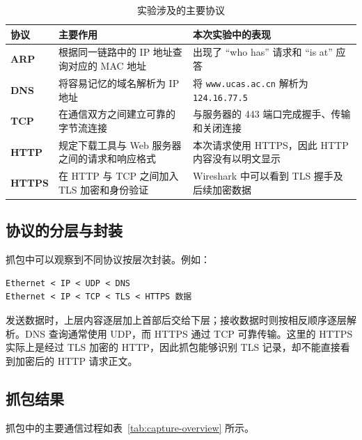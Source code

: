 \documentclass[UTF8,12pt,a4paper,fontset=fandol]{ctexart}
\begin{document}
\begin{table}[H]
  \centering
  \small
  \caption{实验涉及的主要协议}
  \begin{tabularx}{\textwidth}{>{\bfseries\centering\arraybackslash}p{1.5cm}L{5.0cm}Y}
    \toprule
     协议 & 主要作用 & 本次实验中的表现 \\
    \midrule
    ARP & 根据同一链路中的 IP 地址查询对应的 MAC 地址 & 出现了 ``who has'' 请求和 ``is at'' 应答 \\
    DNS & 将容易记忆的域名解析为 IP 地址 & 将 \texttt{www.ucas.ac.cn} 解析为 \texttt{124.16.77.5} \\
    TCP & 在通信双方之间建立可靠的字节流连接 & 与服务器的 443 端口完成握手、传输和关闭连接 \\
    HTTP & 规定下载工具与 Web 服务器之间的请求和响应格式 & 本次请求使用 HTTPS，因此 HTTP 内容没有以明文显示 \\
    HTTPS & 在 HTTP 与 TCP 之间加入 TLS 加密和身份验证 & Wireshark 中可以看到 TLS 握手及后续加密数据 \\
    \bottomrule
  \end{tabularx}
\end{table}

\subsection{协议的分层与封装}

抓包中可以观察到不同协议按层次封装。例如：

\begin{verbatim}
Ethernet < IP < UDP < DNS
Ethernet < IP < TCP < TLS < HTTPS 数据
\end{verbatim}

发送数据时，上层内容逐层加上首部后交给下层；接收数据时则按相反顺序逐层解析。DNS 查询通常使用 UDP，而 HTTPS 通过 TCP 可靠传输。这里的 HTTPS 实际上是经过 TLS 加密的 HTTP，因此抓包能够识别 TLS 记录，却不能直接看到加密后的 HTTP 请求正文。

\subsection{抓包结果}

抓包中的主要通信过程如表~\ref{tab:capture-overview} 所示。
\end{document}
